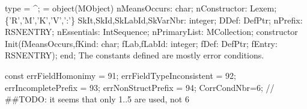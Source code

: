 \nwenddocs{}\endmoddef\nwstartdeflinemarkup{}\nwenddeflinemarkup
type
    = ^;
    =
      object(MObject)
         nMeansOccurs: char;
         nConstructor: Lexem; \{'R','M','K','V',':'\}
         SkIt,SkId,SkLabId,SkVarNbr: integer;
         DDef: DefPtr;
         nPrefix: RSNENTRY;
         nEssentials: IntSequence;
         nPrimaryList: MCollection;
         constructor
            Init(fMeansOccurs,fKind: char;
                 fLab,fLabId: integer;
                 fDef: DefPtr;
                 fEntry: RSNENTRY);
      end;
\eatline
{}\nwendcode{}\nwdocspar
The constants defined are mostly error conditions.

\nwenddocs{}\endmoddef\nwstartdeflinemarkup{}\nwenddeflinemarkup
const
   errFieldHomonimy = 91;
   errFieldTypeInconsistent = 92;
   errIncompletePrefix = 93;
   errNonStructPrefix = 94;
   CorrCondNbr=6;  // ##TODO: it seems that only 1..5 are used, not 6
\nwendcode{}\nwdocspar


